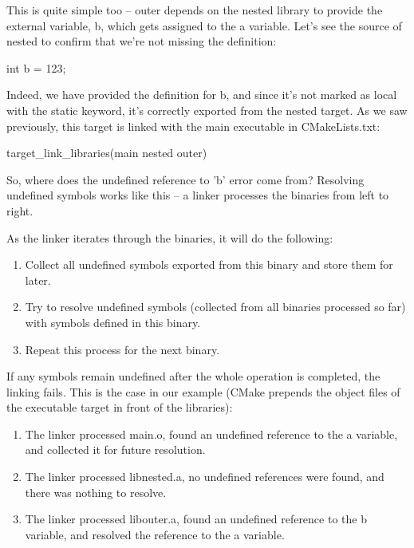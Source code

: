This is quite simple too – outer depends on the nested library to provide the external variable, b, which gets assigned to the a variable. Let’s see the source of nested to confirm that we’re not missing the definition:


\begin{cmake}
int b = 123;
\end{cmake}

Indeed, we have provided the definition for b, and since it’s not marked as local with the static keyword, it’s correctly exported from the nested target. As we saw previously, this target is linked with the main executable in CMakeLists.txt:

\begin{cmake}
target_link_libraries(main nested outer)
\end{cmake}

So, where does the undefined reference to 'b' error come from? Resolving undefined symbols works like this – a linker processes the binaries from left to right.

As the linker iterates through the binaries, it will do the following:

\begin{enumerate}
\item
Collect all undefined symbols exported from this binary and store them for later.

\item
Try to resolve undefined symbols (collected from all binaries processed so far) with symbols defined in this binary.

\item
Repeat this process for the next binary.
\end{enumerate}

If any symbols remain undefined after the whole operation is completed, the linking fails. This is the case in our example (CMake prepends the object files of the executable target in front of the libraries):

\begin{enumerate}
\item
The linker processed main.o, found an undefined reference to the a variable, and collected it for future resolution.

\item
The linker processed libnested.a, no undefined references were found, and there was nothing to resolve.

\item
The linker processed libouter.a, found an undefined reference to the b variable, and resolved the reference to the a variable.
\end{enumerate}

